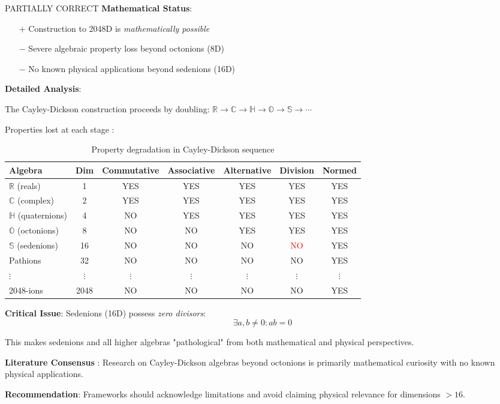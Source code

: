 \begin{factcheck}{PARTIALLY CORRECT}
\textbf{Mathematical Status}:
\begin{itemize}
    \item[$+$] Construction to 2048D is \textit{mathematically possible}
    \item[$-$] Severe algebraic property loss beyond octonions (8D)
    \item[$-$] No known physical applications beyond sedenions (16D)
\end{itemize}

\textbf{Detailed Analysis}:

The Cayley-Dickson construction proceeds by doubling: $\mathbb{R} \to \mathbb{C} \to \mathbb{H} \to \mathbb{O} \to \mathbb{S} \to \cdots$

Properties lost at each stage \cite{baez2001octonions,schafer1954alternative}:

\begin{table}[h]
\centering
\begin{tabular}{lcccccc}
\toprule
Algebra & Dim & Commutative & Associative & Alternative & Division & Normed \\
\midrule
$\mathbb{R}$ (reals) & 1 & YES & YES & YES & YES & YES \\
$\mathbb{C}$ (complex) & 2 & YES & YES & YES & YES & YES \\
$\mathbb{H}$ (quaternions) & 4 & NO & YES & YES & YES & YES \\
$\mathbb{O}$ (octonions) & 8 & NO & NO & YES & YES & YES \\
$\mathbb{S}$ (sedenions) & 16 & NO & NO & NO & \textcolor{red}{NO} & YES \\
Pathions & 32 & NO & NO & NO & NO & YES \\
$\vdots$ & $\vdots$ & $\vdots$ & $\vdots$ & $\vdots$ & $\vdots$ & $\vdots$ \\
2048-ions & 2048 & NO & NO & NO & NO & YES \\
\bottomrule
\end{tabular}
\caption{Property degradation in Cayley-Dickson sequence}
\end{table}

\textbf{Critical Issue}: Sedenions (16D) possess \textit{zero divisors}:
\begin{equation}
\exists a, b \neq 0 : ab = 0
\end{equation}

This makes sedenions and all higher algebras "pathological" from both mathematical and physical perspectives.

\textbf{Literature Consensus} \cite{moreno1998zeros}: Research on Cayley-Dickson algebras beyond octonions is primarily mathematical curiosity with no known physical applications.

\textbf{Recommendation}: Frameworks should acknowledge limitations and avoid claiming physical relevance for dimensions $>16$.
\end{factcheck}

